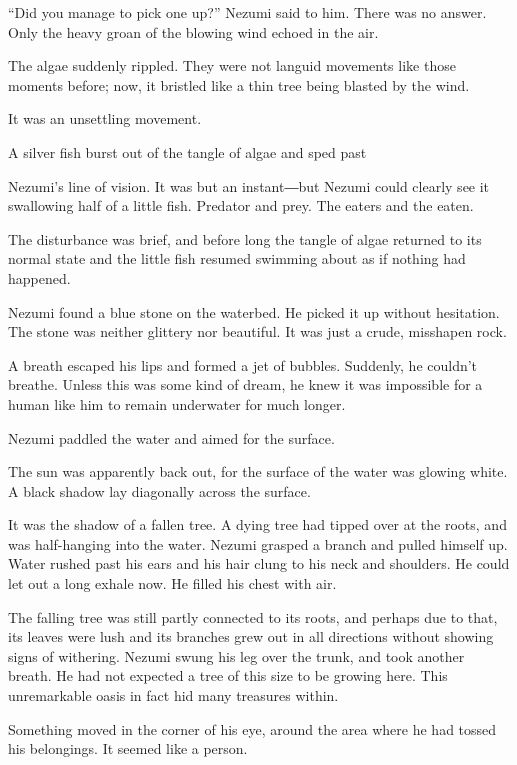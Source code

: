 ``Did you manage to pick one up?'' Nezumi said to him. There was no
answer. Only the heavy groan of the blowing wind echoed in the air.

\mybreak

The algae suddenly rippled. They were not languid movements like those
moments before; now, it bristled like a thin tree being blasted by the
wind.

It was an unsettling movement.

A silver fish burst out of the tangle of algae and sped past~

Nezumi's line of vision. It was but an instant―but Nezumi could clearly
see it swallowing half of a little fish. Predator and prey. The eaters
and the eaten.

The disturbance was brief, and before long the tangle of algae returned
to its normal state and the little fish resumed swimming about as if
nothing had happened.

Nezumi found a blue stone on the waterbed. He picked it up without
hesitation. The stone was neither glittery nor beautiful. It was just a
crude, misshapen rock.

A breath escaped his lips and formed a jet of bubbles. Suddenly, he
couldn't breathe. Unless this was some kind of dream, he knew it was
impossible for a human like him to remain underwater for much longer.

Nezumi paddled the water and aimed for the surface.

The sun was apparently back out, for the surface of the water was
glowing white. A black shadow lay diagonally across the surface.~

It was the shadow of a fallen tree. A dying tree had tipped over at the
roots, and was half-hanging into the water. Nezumi grasped a branch and
pulled himself up. Water rushed past his ears and his hair clung to his
neck and shoulders. He could let out a long exhale now. He filled his
chest with air.

The falling tree was still partly connected to its roots, and perhaps
due to that, its leaves were lush and its branches grew out in all
directions without showing signs of withering. Nezumi swung his leg over
the trunk, and took another breath. He had not expected a tree of this
size to be growing here. This unremarkable oasis in fact hid many
treasures within.

Something moved in the corner of his eye, around the area where he had
tossed his belongings. It seemed like a person.

